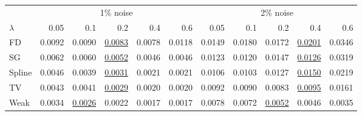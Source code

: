 \begin{tabular}{l|rrrrr|rrrrr}\toprule
 & \multicolumn{5}{c}{1\% noise} & \multicolumn{5}{c}{2\% noise} \\
$\lambda$ & 0.05 & 0.1 & 0.2 & 0.4 & 0.6 & 0.05 & 0.1 & 0.2 & 0.4 & 0.6 \\\midrule
FD & 0.0092 & 0.0090 & \underline{0.0083} & 0.0078 & \colorbox{black!15}{0.0118} & 0.0149 & 0.0180 & 0.0172 & \colorbox{black!15}{\underline{0.0201}} & 0.0346 \\
SG & 0.0062 & 0.0060 & \underline{0.0052} & 0.0046 & \colorbox{black!15}{0.0046} & 0.0123 & 0.0120 & 0.0147 & \colorbox{black!15}{\underline{0.0126}} & 0.0319 \\
Spline & 0.0046 & 0.0039 & \underline{0.0031} & 0.0021 & \colorbox{black!15}{0.0021} & 0.0106 & 0.0103 & 0.0127 & \colorbox{black!15}{\underline{0.0150}} & 0.0219 \\
TV & 0.0043 & 0.0041 & \underline{0.0029} & 0.0020 & \colorbox{black!15}{0.0020} & 0.0092 & 0.0090 & 0.0083 & \colorbox{black!15}{\underline{0.0095}} & 0.0161 \\
Weak & 0.0034 & \underline{0.0026} & 0.0022 & 0.0017 & \colorbox{black!15}{0.0017} & 0.0078 & 0.0072 & \underline{0.0052} & 0.0046 & \colorbox{black!15}{0.0035} \\
\bottomrule\end{tabular}
